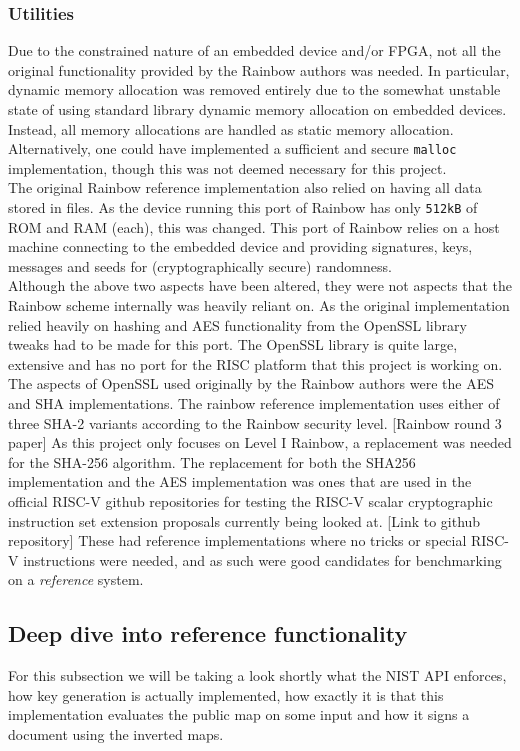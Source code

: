 \subsubsection{Utilities} \label{utils}
Due to the constrained nature of an embedded device and/or FPGA, not all the original functionality provided by the Rainbow authors was needed. In particular, dynamic memory allocation was removed entirely due to the somewhat unstable state of using standard library dynamic memory allocation on embedded devices. Instead, all memory allocations are handled as static memory allocation. Alternatively, one could have implemented a sufficient and secure \texttt{malloc} implementation, though this was not deemed necessary for this project.\medskip\\
The original Rainbow reference implementation also relied on having all data stored in files. As the device running this port of Rainbow has only \texttt{512kB} of ROM and RAM (each), this was changed. This port of Rainbow relies on a host machine connecting to the embedded device and providing signatures, keys, messages and seeds for (cryptographically secure) randomness.\medskip\\
Although the above two aspects have been altered, they were not aspects that the Rainbow scheme internally was heavily reliant on. As the original implementation relied heavily on hashing and AES functionality from the OpenSSL library tweaks had to be made for this port. The OpenSSL library is quite large, extensive and has no port for the RISC platform that this project is working on.
\medskip\\
The aspects of OpenSSL used originally by the Rainbow authors were the AES and SHA implementations. The rainbow reference implementation uses either of three SHA-2 variants according to the Rainbow security level. [Rainbow round 3 paper] As this project only focuses on Level I Rainbow, a replacement was needed for the SHA-256 algorithm. The replacement for both the SHA256 implementation and the AES implementation was ones that are used in the official RISC-V github repositories for testing the RISC-V scalar cryptographic instruction set extension proposals currently being looked at. [Link to github repository] These had reference implementations where no tricks or special RISC-V instructions were needed, and as such were good candidates for benchmarking on a \textit{reference} system.

\subsection{Deep dive into reference functionality} \label{deepdive}
For this subsection we will be taking a look shortly what the NIST API enforces, how key generation is actually implemented, how exactly it is that this implementation evaluates the public map on some input and how it signs a document using the inverted maps.
